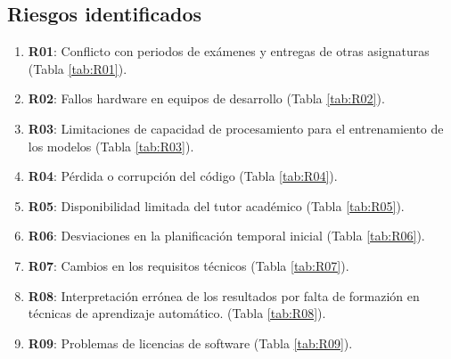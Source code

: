\subsection*{Riesgos identificados}
\begin{enumerate}
    \item \textbf{R01}: Conflicto con periodos de exámenes y entregas de otras asignaturas (Tabla \ref{tab:R01}).
    \item \textbf{R02}: Fallos hardware en equipos de desarrollo (Tabla \ref{tab:R02}).
    \item \textbf{R03}: Limitaciones de capacidad de procesamiento para el entrenamiento de los modelos (Tabla \ref{tab:R03}).
    \item \textbf{R04}: Pérdida o corrupción del código (Tabla \ref{tab:R04}).
    \item \textbf{R05}: Disponibilidad limitada del tutor académico (Tabla \ref{tab:R05}).
    \item \textbf{R06}: Desviaciones en la planificación temporal inicial (Tabla \ref{tab:R06}).
    \item \textbf{R07}: Cambios en los requisitos técnicos (Tabla \ref{tab:R07}).
    \item \textbf{R08}: Interpretación errónea de los resultados por falta de formazión en técnicas de aprendizaje automático. (Tabla \ref{tab:R08}).
    \item \textbf{R09}: Problemas de licencias de software (Tabla \ref{tab:R09}).
\end{enumerate}


